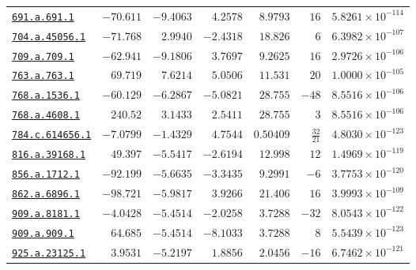 \documentclass[10pt]{article}
\begin{document}
\begin{landscape}
\begin{longtable}{@{}lrrrrrr@{}}
\href{https://www.lmfdb.org/Genus2Curve/Q/691/a/691/1}{\texttt{691.a.691.1}} & $-70.611$ & $-9.4063$ & $4.2578$ & $8.9793$ & $16$ & $5.8261\times 10^{-114}$ \\
\href{https://www.lmfdb.org/Genus2Curve/Q/704/a/45056/1}{\texttt{704.a.45056.1}} & $-71.768$ & $2.9940$ & $-2.4318$ & $18.826$ & $6$ & $6.3982\times 10^{-107}$ \\
\href{https://www.lmfdb.org/Genus2Curve/Q/709/a/709/1}{\texttt{709.a.709.1}} & $-62.941$ & $-9.1806$ & $3.7697$ & $9.2625$ & $16$ & $2.9726\times 10^{-106}$ \\
\href{https://www.lmfdb.org/Genus2Curve/Q/763/a/763/1}{\texttt{763.a.763.1}} & $69.719$ & $7.6214$ & $5.0506$ & $11.531$ & $20$ & $1.0000\times 10^{-105}$ \\
\href{https://www.lmfdb.org/Genus2Curve/Q/768/a/1536/1}{\texttt{768.a.1536.1}} & $-60.129$ & $-6.2867$ & $-5.0821$ & $28.755$ & $-48$ & $8.5516\times 10^{-106}$ \\
\href{https://www.lmfdb.org/Genus2Curve/Q/768/a/4608/1}{\texttt{768.a.4608.1}} & $240.52$ & $3.1433$ & $2.5411$ & $28.755$ & $3$ & $8.5516\times 10^{-106}$ \\
\href{https://www.lmfdb.org/Genus2Curve/Q/784/c/614656/1}{\texttt{784.c.614656.1}} & $-7.0799$ & $-1.4329$ & $4.7544$ & $0.50409$ & $\frac{32}{21}$ & $4.8030\times 10^{-123}$ \\
\href{https://www.lmfdb.org/Genus2Curve/Q/816/a/39168/1}{\texttt{816.a.39168.1}} & $49.397$ & $-5.5417$ & $-2.6194$ & $12.998$ & $12$ & $1.4969\times 10^{-119}$ \\
\href{https://www.lmfdb.org/Genus2Curve/Q/856/a/1712/1}{\texttt{856.a.1712.1}} & $-92.199$ & $-5.6635$ & $-3.3435$ & $9.2991$ & $-6$ & $3.7753\times 10^{-120}$ \\
\href{https://www.lmfdb.org/Genus2Curve/Q/862/a/6896/1}{\texttt{862.a.6896.1}} & $-98.721$ & $-5.9817$ & $3.9266$ & $21.406$ & $16$ & $3.9993\times 10^{-109}$ \\
\href{https://www.lmfdb.org/Genus2Curve/Q/909/a/8181/1}{\texttt{909.a.8181.1}} & $-4.0428$ & $-5.4514$ & $-2.0258$ & $3.7288$ & $-32$ & $8.0543\times 10^{-122}$ \\
\href{https://www.lmfdb.org/Genus2Curve/Q/909/a/909/1}{\texttt{909.a.909.1}} & $64.685$ & $-5.4514$ & $-8.1033$ & $3.7288$ & $8$ & $5.5439\times 10^{-123}$ \\
\href{https://www.lmfdb.org/Genus2Curve/Q/925/a/23125/1}{\texttt{925.a.23125.1}} & $3.9531$ & $-5.2197$ & $1.8856$ & $2.0456$ & $-16$ & $6.7462\times 10^{-121}$ \\

\end{longtable}
\end{landscape}
\end{document}
